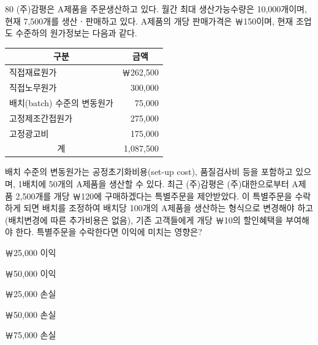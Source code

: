 \begin{question}{80}
(주)감평은 A제품을 주문생산하고 있다. 월간 최대 생산가능수량은 10,000개이며, 현재 7,500개를 생산ㆍ판매하고 있다. A제품의 개당 판매가격은 ￦150이며, 현재 조업도 수준하의 원가정보는 다음과 같다.

{\small\centering
\begin{tabular}{|l|r|}\hline
\multicolumn{1}{|c|}{구분} & \multicolumn{1}{c|}{금액} \\ \hline
직접재료원가 & ￦262,500 \\ \hline
직접노무원가 & 300,000 \\ \hline
배치(batch) 수준의 변동원가 & 75,000 \\ \hline
고정제조간접원가 & 275,000 \\ \hline
고정광고비 & 175,000 \\ \hline
\multicolumn{1}{|c|}{계} & 1,087,500 \\ \hline
\end{tabular}\par}

배치 수준의 변동원가는 공정초기화비용(set-up cost), 품질검사비 등을 포함하고 있으며, 1배치에 50개의 A제품을 생산할 수 있다. 최근 (주)감평은 (주)대한으로부터 A제품 2,500개를 개당 ￦120에 구매하겠다는 특별주문을 제안받았다. 이 특별주문을 수락하게 되면 배치를 조정하여 배치당 100개의 A제품을 생산하는 형식으로 변경해야 하고(배치변경에 따른 추가비용은 없음), 기존 고객들에게 개당 ￦10의 할인혜택을 부여해야 한다. 특별주문을 수락한다면 이익에 미치는 영향은?
\begin{choices}
  \item ￦25,000 이익
  \item ￦50,000 이익
  \item ￦25,000 손실
  \item ￦50,000 손실
  \item ￦75,000 손실
\end{choices}
\end{question}
